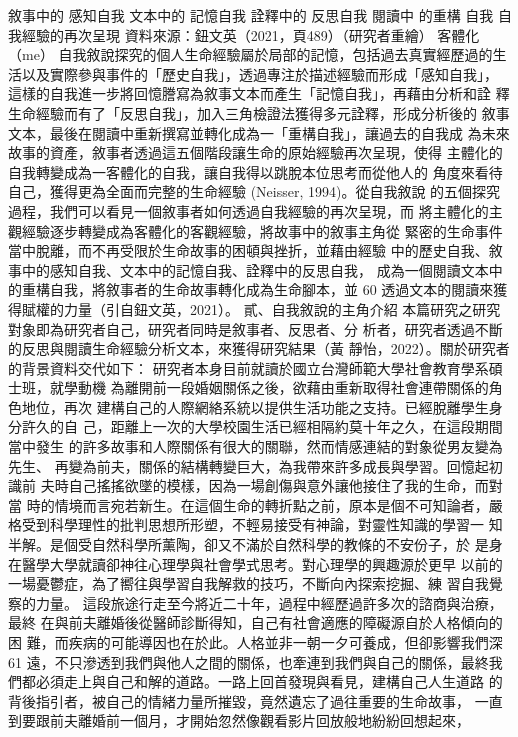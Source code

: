 敘事中的
感知自我
文本中的
記憶自我
詮釋中的
反思自我
閱讀中
的重構
自我
自我經驗的再次呈現
資料來源：鈕文英（2021，頁489）（研究者重繪） 
客體化（me）
自我敘說探究的個人生命經驗屬於局部的記憶，包括過去真實經歷過的生
活以及實際參與事件的「歷史自我」，透過專注於描述經驗而形成「感知自我」，
這樣的自我進一步將回憶謄寫為敘事文本而產生「記憶自我」，再藉由分析和詮
釋生命經驗而有了「反思自我」，加入三角檢證法獲得多元詮釋，形成分析後的
敘事文本，最後在閱讀中重新撰寫並轉化成為一「重構自我」，讓過去的自我成
為未來故事的資產，敘事者透過這五個階段讓生命的原始經驗再次呈現，使得
主體化的自我轉變成為一客體化的自我，讓自我得以跳脫本位思考而從他人的
角度來看待自己，獲得更為全面而完整的生命經驗 (Neisser, 1994)。從自我敘說
的五個探究過程，我們可以看見一個敘事者如何透過自我經驗的再次呈現，而
將主體化的主觀經驗逐步轉變成為客體化的客觀經驗，將故事中的敘事主角從
緊密的生命事件當中脫離，而不再受限於生命故事的困頓與挫折，並藉由經驗
中的歷史自我、敘事中的感知自我、文本中的記憶自我、詮釋中的反思自我，
成為一個閱讀文本中的重構自我，將敘事者的生命故事轉化成為生命腳本，並
60 
透過文本的閱讀來獲得賦權的力量（引自鈕文英，2021）。 
貳、自我敘說的主角介紹 
本篇研究之研究對象即為研究者自己，研究者同時是敘事者、反思者、分
析者，研究者透過不斷的反思與閱讀生命經驗分析文本，來獲得研究結果（黃
靜怡，2022）。關於研究者的背景資料交代如下： 
研究者本身目前就讀於國立台灣師範大學社會教育學系碩士班，就學動機
為離開前一段婚姻關係之後，欲藉由重新取得社會連帶關係的角色地位，再次
建構自己的人際網絡系統以提供生活功能之支持。已經脫離學生身分許久的自
己，距離上一次的大學校園生活已經相隔約莫十年之久，在這段期間當中發生
的許多故事和人際關係有很大的關聯，然而情感連結的對象從男友變為先生、
再變為前夫，關係的結構轉變巨大，為我帶來許多成長與學習。回憶起初識前
夫時自己搖搖欲墜的模樣，因為一場創傷與意外讓他接住了我的生命，而對當
時的情境而言宛若新生。在這個生命的轉折點之前，原本是個不可知論者，嚴
格受到科學理性的批判思想所形塑，不輕易接受有神論，對靈性知識的學習一
知半解。是個受自然科學所薰陶，卻又不滿於自然科學的教條的不安份子，於
是身在醫學大學就讀卻神往心理學與社會學式思考。對心理學的興趣源於更早
以前的一場憂鬱症，為了嚮往與學習自我解救的技巧，不斷向內探索挖掘、練
習自我覺察的力量。 
這段旅途行走至今將近二十年，過程中經歷過許多次的諮商與治療，最終
在與前夫離婚後從醫師診斷得知，自己有社會適應的障礙源自於人格傾向的困
難，而疾病的可能導因也在於此。人格並非一朝一夕可養成，但卻影響我們深
61 
遠，不只滲透到我們與他人之間的關係，也牽連到我們與自己的關係，最終我
們都必須走上與自己和解的道路。一路上回首發現與看見，建構自己人生道路
的背後指引者，被自己的情緒力量所摧毀，竟然遺忘了過往重要的生命故事，
一直到要跟前夫離婚前一個月，才開始忽然像觀看影片回放般地紛紛回想起來，
